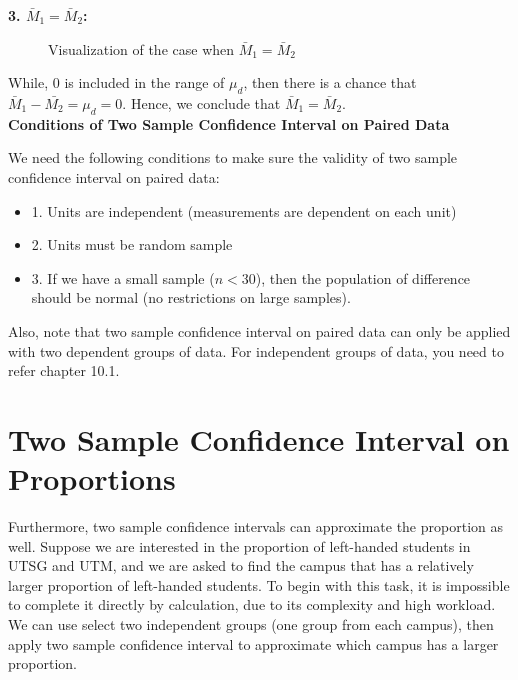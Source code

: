 \textbf{3. $\bar{M}_1 = \bar{M}_2$:}

\begin{center}
\begin{figure}[H]
\centering
{}
\caption{Visualization of the case when $\bar{M}_1 = \bar{M}_2$}
\end{figure}
\end{center}

While, 0 is included in the range of $\mu_d$, then there is a chance that $\bar{M}_1 - \bar{M_2} = \mu_d = 0.$ Hence, we conclude that $\bar{M}_1 = \bar{M}_2$.\\

\textbf{Conditions of Two Sample Confidence Interval on Paired Data}

We need the following conditions to make sure the validity of two sample confidence interval on paired data:

\begin{itemize}
	\item 1. Units are independent (measurements are dependent on each unit)
	\item 2. Units must be random sample
	\item 3. If we have a small sample ($n < 30$), then the population of difference should be normal (no restrictions on large samples).
\end{itemize}

Also, note that two sample confidence interval on paired data can only be applied with two dependent groups of data. For independent groups of data, you need to refer chapter 10.1.

\section{Two Sample Confidence Interval on Proportions}

Furthermore, two sample confidence intervals can approximate the proportion as well. Suppose we are interested in the proportion of left-handed students in UTSG and UTM, and we are asked to find the campus that has a relatively larger proportion of left-handed students. To begin with this task, it is impossible to complete it directly by calculation, due to its complexity and high workload. We can use select two independent groups (one group from each campus), then apply two sample confidence interval to approximate which campus has a larger proportion.\\

